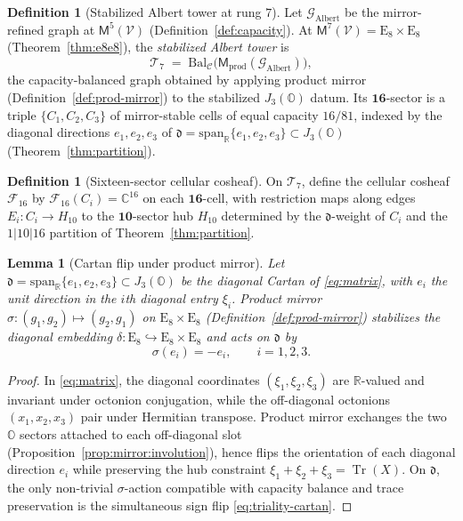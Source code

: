 \documentclass[aps,prd,onecolumn,amsmath,amssymb,nofootinbib,11pt]{revtex4-2}
\numberwithin{equation}{section}
\theoremstyle{plain}
\newtheorem{lemma}[theorem]{Lemma}
\theoremstyle{definition}
\newtheorem{definition}[theorem]{Definition}
\theoremstyle{remark}
\newcommand{\R}{\mathbb{R}}
\newcommand{\C}{\mathbb{C}}
\newcommand{\Oct}{\mathbb{O}}
\newcommand{\jalg}{J_3(\mathbb{O})}
\newcommand{\E}[1]{\mathrm{E}_{#1}}
\newcommand{\Tr}{\operatorname{Tr}}
\newcommand{\Void}{\mathcal{V}}
\newcommand{\Mirror}{\mathsf{M}}
\begin{document}
\begin{definition}[Stabilized Albert tower at rung $7$]\label{def:tower7}
Let $\mathcal{G}_{\mathrm{Albert}}$ be the mirror-refined graph at
$\Mirror^5(\Void)$ (Definition~\ref{def:capacity}). At
$\Mirror^7(\Void)=\E{8}\times\E{8}$ (Theorem~\ref{thm:e8e8}), the
\emph{stabilized Albert tower} is
\begin{equation}\label{eq:tower7}
  \mathcal{T}_7
  \;=\;
  \mathrm{Bal}_{\mathcal{C}}\bigl(\Mirror_{\mathrm{prod}}(\mathcal{G}_{\mathrm{Albert}})\bigr),
\end{equation}
the capacity-balanced graph obtained by applying product mirror
(Definition~\ref{def:prod-mirror}) to the stabilized $\jalg$ datum. Its
$\mathbf{16}$-sector is a triple $\{C_1,C_2,C_3\}$ of mirror-stable cells of
equal capacity $16/81$, indexed by the diagonal directions
$e_1,e_2,e_3$ of $\mathfrak{d}=\mathrm{span}_\R\{e_1,e_2,e_3\}\subset\jalg$
(Theorem~\ref{thm:partition}).
\end{definition}

\begin{definition}[Sixteen-sector cellular cosheaf]\label{def:F16}
On $\mathcal{T}_7$, define the cellular cosheaf $\mathcal{F}_{16}$ by
$\mathcal{F}_{16}(C_i)=\C^{16}$ on each $\mathbf{16}$-cell, with restriction
maps along edges $E_i:C_i\to H_{10}$ to the $\mathbf{10}$-sector hub $H_{10}$
determined by the $\mathfrak{d}$-weight of $C_i$ and the $1|10|16$ partition
of Theorem~\ref{thm:partition}.
\end{definition}

\begin{lemma}[Cartan flip under product mirror]\label{lem:triality-cartan}
Let $\mathfrak{d}=\mathrm{span}_\R\{e_1,e_2,e_3\}\subset\jalg$ be the diagonal
Cartan of \eqref{eq:matrix}, with $e_i$ the unit direction in the $i$th diagonal
entry $\xi_i$. Product mirror
$\sigma:(g_1,g_2)\mapsto(g_2,g_1)$ on $\E{8}\times\E{8}$
(Definition~\ref{def:prod-mirror}) stabilizes the diagonal embedding
$\delta:\E{8}\hookrightarrow\E{8}\times\E{8}$ and acts on $\mathfrak{d}$ by
\begin{equation}\label{eq:triality-cartan}
  \sigma(e_i)=-e_i,
  \qquad i=1,2,3.
\end{equation}
\end{lemma}

\begin{proof}
In \eqref{eq:matrix}, the diagonal coordinates $(\xi_1,\xi_2,\xi_3)$ are
$\R$-valued and invariant under octonion conjugation, while the off-diagonal
octonions $(x_1,x_2,x_3)$ pair under Hermitian transpose. Product mirror
exchanges the two $\Oct$ sectors attached to each off-diagonal slot
(Proposition~\ref{prop:mirror:involution}), hence flips the orientation of each
diagonal direction $e_i$ while preserving the hub constraint
$\xi_1+\xi_2+\xi_3=\Tr(X)$. On $\mathfrak{d}$, the only non-trivial
$\sigma$-action compatible with capacity balance and trace preservation is the
simultaneous sign flip \eqref{eq:triality-cartan}.
\end{proof}
\end{document}
